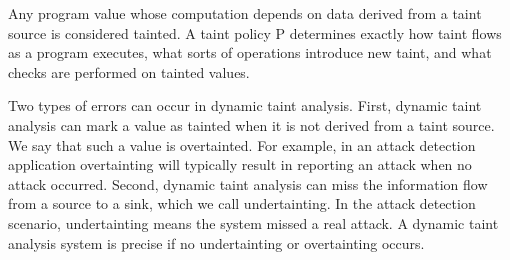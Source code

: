 Any program value whose computation depends on data derived from a taint source is considered tainted. A taint policy P determines exactly how taint flows as a program executes, what sorts of operations introduce new taint, and
what checks are performed on tainted values.

Two types of errors can occur in dynamic taint analysis.
First, dynamic taint analysis can mark a value as tainted
when it is not derived from a taint source. We say that such
a value is overtainted. For example, in an attack detection
application overtainting will typically result in reporting
an attack when no attack occurred. Second, dynamic taint
analysis can miss the information flow from a source to a
sink, which we call undertainting. In the attack detection
scenario, undertainting means the system missed a real
attack. A dynamic taint analysis system is precise if no
undertainting or overtainting occurs.
